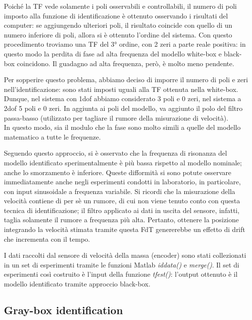 Poiché la TF vede solamente i poli osservabili e controllabili, il numero di poli imposto alla funzione di identificazione è ottenuto osservando i risultati del computer: se aggiungendo ulteriori poli, il risultato coincide con quello di un numero inferiore di poli, allora si è ottenuto l'ordine del sistema.
Con questo procedimento troviamo una TF del 3° ordine, con 2 zeri a parte reale positiva: in questo modo la perdita di fase ad alta frequenza del modello white-box e black-box coincidono. Il guadagno ad alta frequenza, però, è molto meno pendente.

Per sopperire questo problema, abbiamo deciso di imporre il numero di poli e zeri nell'identificazione: sono stati imposti uguali alla TF ottenuta nella white-box. Dunque, nel sistema con 1dof abbiamo considerato 3 poli e 0 zeri, nel sistema a 2dof 5 poli e 0 zeri.
In aggiunta ai poli del modello, va aggiunto il polo del filtro passa-basso (utilizzato per tagliare il rumore della misurazione di velocità). \\
In questo modo, sia il modulo che la fase sono molto simili a quelle del modello matematico a tutte le frequenze.

Seguendo questo approccio, si è osservato che la frequenza di risonanza del modello identificato sperimentalmente è più bassa rispetto al modello nominale; anche lo smorzamento è inferiore.
Queste difformità si sono potute osservare immediatamente anche negli esperimenti condotti in laboratorio, in particolare, con input sinusoidale a frequenza variabile.
Si ricordi che la misurazione della velocità contiene di per sè un rumore, di cui non viene tenuto conto con questa tecnica di identificazione; il filtro applicato ai dati in uscita del sensore, infatti, taglia solamente il rumore a frequenza più alta.
Pertanto, ottenere la posizione integrando la velocità stimata tramite questa FdT genererebbe un effetto di drift che incrementa con il tempo.

I dati raccolti dal sensore di velocità della massa (encoder) sono stati collezionati in un set di esperimenti tramite le funzioni Matlab \textit{iddata()} e \textit{merge()}. Il set di esperimenti così costruito è l'input della funzione \textit{tfest()}: l'output ottenuto è il modello identificato tramite approccio black-box.

\subsection{Gray-box identification}

